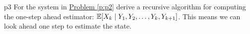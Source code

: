\documentclass[a4paper, 11pt]{article}
\begin{document}


\begin{problem}{%
    }{p3%
    }
For the system in \hyperref[p:p2]{Problem \ref{p:p2}} derive a recursive algorithm for computing the one-step ahead estimator: $\mathbb{E}[{X_k\mid Y_1,Y_2,\dots, Y_k,Y_{k+1}}]$. This means we can look ahead one step to estimate the state.
\end{problem}
\solve{

}
\end{document}
